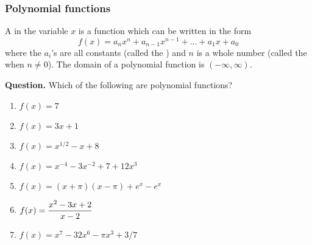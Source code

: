 \documentclass[10pt,t,presentation,ignorenonframetext,aspectratio=169]{beamer}
\begin{document}
\begin{frame}
  \frametitle{Polynomial functions}
  \begin{definition}
    A  in the variable $x$ is a function
    which can be written in the form
    \[
      f(x) = a_nx^n + a_{n-1}x^{n-1} + \dots + a_1 x + a_0
    \]
    where the $a_i$'s are all constants (called the )
    and $n$ is a whole number (called the  when $n\ne
    0$). The domain of a polynomial function is $(-\infty,\infty)$.
  \end{definition}
\end{frame}

\begin{frame}
  \vs
  \textbf{Question.} Which of the following are polynomial functions?
  \vs
  \begin{enumerate}
  \item $f(x) = 7$ \vsone
  \item $f(x) = 3x+1$ \vsone
  \item $f(x) = x^{1/2}-x +8$ \vsone
  \item $f(x) = x^{-4}-3x^{-2}+7+12x^3$ \vsone
  \item $f(x) = (x+\pi)(x-\pi)+e^x - e^x $ \vsone
  \item $\displaystyle f(x) = \frac{x^2 - 3x + 2}{x-2}$ \vsone
  \item $f(x) = x^7-32x^6-\pi x^3+3/7$ \vsone
  \end{enumerate}
\end{frame}
\end{document}
